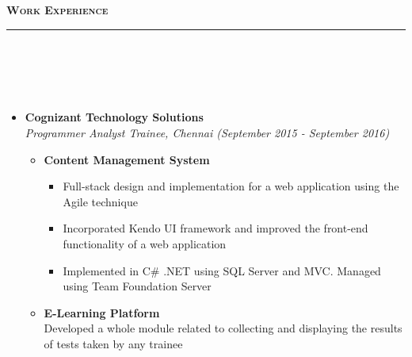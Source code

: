 \documentclass[a4paper,10pt]{article}
\newcommand{\isep}{-2 pt}
\newcommand{\lsep}{-0.5cm}
\newcommand{\resheading}[1]{{\small
        {
            \begin{minipage}
                {0.992\textwidth}\textbf{{\textsc{#1 \vphantom{p\^{E}} }}}
                \\[-0.3cm]
                \hrule
            \end{minipage}
            \\[-0.5cm]
        }
 }}
\begin{document}
 \vspace{0.05cm}
\resheading{\textbf{\large Work Experience}}\\[\lsep]
\\[-0.38cm]
\begin{itemize}
    \item \textbf{Cognizant Technology Solutions}\\
        \emph{Programmer Analyst Trainee, Chennai 
        \hfill (September 2015 - September 2016)}
        \\ [-0.6cm]
        \begin{itemize}\itemsep \isep
        \item \textbf{Content Management System}
            \begin{itemize}
                \item Full-stack design and implementation for a web application using the Agile technique
                \item Incorporated Kendo UI framework and improved the front-end functionality of a web application
                \item Implemented in C\# .NET using SQL Server and MVC. Managed using Team Foundation Server
            \end{itemize}
        \item \textbf{E-Learning Platform}\\
        Developed a whole module related to collecting and displaying the results of tests taken by any trainee
        \\[-0.5cm]
        \end{itemize}
        

\end{itemize}
\end{document}
